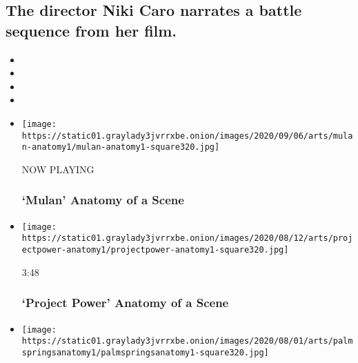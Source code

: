 \hypertarget{the-director-niki-caro-narrates-a-battle-sequence-from-her-film-1}{%
\subsection{The director Niki Caro narrates a battle sequence from her
film.}\label{the-director-niki-caro-narrates-a-battle-sequence-from-her-film-1}}

\begin{itemize}
\item
\item
\item
\item
\end{itemize}

\begin{itemize}
\item
  \texttt{[image: https://static01.graylady3jvrrxbe.onion/images/2020/09/06/arts/mulan-anatomy1/mulan-anatomy1-square320.jpg]}

  NOW PLAYING

  \hypertarget{mulan--anatomy-of-a-scene-2}{%
  \subsubsection{`Mulan' \textbar{} Anatomy of a
  Scene}\label{mulan--anatomy-of-a-scene-2}}
\item
  \href{https://www.nytimes3xbfgragh.onion/video/movies/100000007287612/project-power-scene.html?action=click\&module=video-series-bar\&region=header\&pgtype=Article\&playlistId=video/anatomy-of-a-scene}{}

  \texttt{[image: https://static01.graylady3jvrrxbe.onion/images/2020/08/12/arts/projectpower-anatomy1/projectpower-anatomy1-square320.jpg]}

  3:48

  \hypertarget{project-power--anatomy-of-a-scene}{%
  \subsubsection{`Project Power' \textbar{} Anatomy of a
  Scene}\label{project-power--anatomy-of-a-scene}}
\item
  \href{https://www.nytimes3xbfgragh.onion/video/movies/100000007265338/palm-springs-scene.html?action=click\&module=video-series-bar\&region=header\&pgtype=Article\&playlistId=video/anatomy-of-a-scene}{}

  \texttt{[image: https://static01.graylady3jvrrxbe.onion/images/2020/08/01/arts/palmspringsanatomy1/palmspringsanatomy1-square320.jpg]}


\end{itemize}
